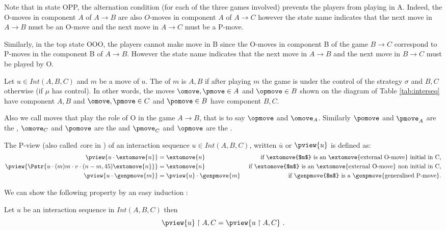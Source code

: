 Note that in state OPP, the alternation condition (for each of the three games involved) prevents the players from playing in A. Indeed, the O-moves in component $A$ of $A\rightarrow B$ are also $O$-moves in component $A$ of $A\rightarrow C$ however the state name indicates that the next move in $A\rightarrow B$ must be an O-move and the next move in $A\rightarrow C$ must be a P-move.

Similarly, in the top state OOO, the players cannot make move in B since the O-moves in component B of the game $B\rightarrow C$ correspond to P-moves in the component B of $A\rightarrow B$. However the state name indicates that the next move in $A\rightarrow B$ and the next move in $B\rightarrow C$ must be played by O.


Let $u \in Int(A,B,C)$ and $m$ be a move of $u$.
The  of $m$ is $A,B$ if 
after playing $m$ the game is under the control 
of the strategy $\sigma$ and $B,C$ otherwise (if $\mu$ has control).
In other words, the moves $\omove, \pmove \in A$
and $\opmove \in B$ shown on the diagram of Table \ref{tab:interseq}
have component $A,B$ and 
$\omove, \pmove \in C$ and $\pomove \in B$
have component $B,C$.


Also we call 
moves that play the role of O in the game $A\rightarrow B$, that is to say $\opmove$ and $\omove_A$.
Similarly $\pomove$ and $\pmove_A$ are the ,
$\omove_C$ and $\pomove$ are
the 
and  $\pmove_C$ and $\opmove$ are the .

The P-view (also called {\emph core} in \cite{McCusker-GamesandFullAbstrac}) of an interaction sequence $u \in Int(A,B,C)$, written $\overline{u}$ or $\pview{u}$ is defined as:
\begin{align*}
\pview{u\cdot \extomove{n}} &= \extomove{n} &
\mbox{ if \extomove{$m$} is an \extomove{external O-move} initial in C,}\\
\pview{\Pstr{u\cdot (m)m\cdot v \cdot (n-m,45){\extomove{n}} }} &= \extomove{n} &\mbox{ if \extomove{$m$} is an \extomove{external O-move} non initial in C,}\\
\pview{u \cdot \genpmove{m}} &= \pview{u}\cdot \genpmove{m}  & \mbox{ if \genpmove{$m$} is a \genpmove{generalised P-move}.}\\ 
\end{align*}

We can show the following property by an easy induction :
\begin{lemma}
\label{lem:interaction_projection}
 Let $u$ be an interaction sequence in $Int(A,B,C)$ then
$$\pview{u} \upharpoonright A,C = \pview{u \upharpoonright A,C} \ .$$
\end{lemma}

